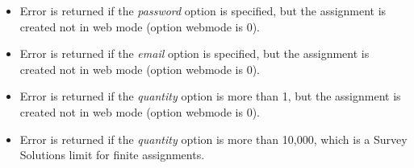 \errheader
\begin{itemize}
    \item Error  is returned if the \textit{password} option is
    specified, but the assignment is created not in web mode (option webmode is
    0).

    \item Error  is returned if the \textit{email} option is
    specified, but the assignment is created not in web mode (option webmode is
    0).

    \item Error  is returned if the \textit{quantity} option is
    more than 1, but the assignment is created not in web mode (option webmode is
    0).

    \item Error  is returned if the \textit{quantity} option is
    more than 10,000, which is a Survey Solutions limit for finite assignments.
\end{itemize}
